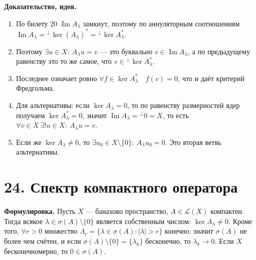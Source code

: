 \documentclass[10pt,a4paper]{article}
\begin{document}
	\textbf{Доказательство, идея.}
	\begin{enumerate}
		\item По билету 20 $\operatorname{Im}A_\lambda$ замкнут, поэтому по аннуляторным соотношениям $\operatorname{Im}A_\lambda={}^{\perp}\ker(A_\lambda)^*={}^{\perp}\ker A_\lambda^*$.

		\item Поэтому $\exists u\in X:\ A_\lambda u=v$ --- это буквально $v\in\operatorname{Im}A_\lambda$, а по предыдущему равенству это то же самое, что $v\in{}^{\perp}\ker A_\lambda^*$.

		\item Последнее означает ровно $\forall f\in\ker A_\lambda^*\quad f(v)=0$, что и даёт критерий Фредгольма.

		\item Для альтернативы: если $\ker A_\lambda=0$, то по равенству размерностей ядер получаем $\ker A_\lambda^*=0$, значит $\operatorname{Im}A_\lambda={}^{\perp}0=X$, то есть $\forall v\in X\ \exists!u\in X:\ A_\lambda u=v$.

		\item Если же $\ker A_\lambda\ne0$, то $\exists u_0\in X\setminus\{0\}:\ A_\lambda u_0=0$. Это вторая ветвь альтернативы.
	\end{enumerate}

	\section*{24. Спектр компактного оператора}
	\textbf{Формулировка.} Пусть $X$ --- банахово пространство, $A\in\mathcal L(X)$ компактен. Тогда всякое $\lambda\in\sigma(A)\setminus\{0\}$ является собственным числом: $\ker A_\lambda\ne0$. Кроме того, $\forall r>0$ множество $\Lambda_r=\{\lambda\in\sigma(A):|\lambda|>r\}$ конечно; значит $\sigma(A)$ не более чем счётен, и если $\sigma(A)\setminus\{0\}=\{\lambda_k\}$ бесконечно, то $\lambda_k\to0$. Если $X$ бесконечномерно, то $0\in\sigma(A)$.
\end{document}
